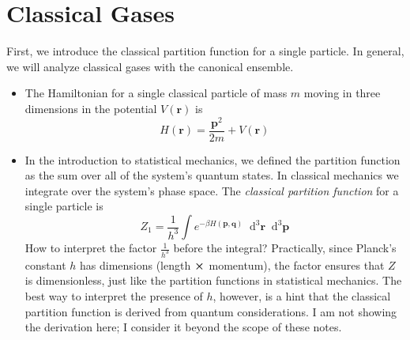 \documentclass[11pt, a4paper]{article}
\newcommand{\diff}{\mathop{}\!\mathrm{d}} %
\begin{document}
\section{Classical Gases}
First, we introduce the classical partition function for a single particle. In general, we will analyze classical gases with the canonical ensemble. 
\begin{itemize}
	\item The Hamiltonian for a single classical particle of mass $ m $ moving in three dimensions in the potential $ V(\bm{r}) $ is
	\begin{equation*}
		H(\bm{r}) = \frac{\bm{p}^{2}}{2m} + V(\bm{r})
	\end{equation*}
	
	\item In the introduction to statistical mechanics, we defined the partition function as the sum over all of the system's quantum states. In classical mechanics we integrate over the system's phase space. The \textit{classical partition function} for a single particle is
	\begin{equation*}
		Z_{1} = \frac{1}{h^{3}}\int e^{-\beta H(\bm{p}, \bm{q})} \diff^{3}\bm{r}\diff^{3}\bm{p}
	\end{equation*}
	How to interpret the factor $ \frac{1}{h^{3}} $ before the integral? Practically, since Planck's constant $ h $ has dimensions (length $ \cross $ momentum), the factor ensures that $ Z $ is dimensionless, just like the partition functions in statistical mechanics. The best way to interpret the presence of $ h $, however, is a hint that the classical partition function is derived from quantum considerations. I am not showing the derivation here; I consider it beyond the scope of these notes. 
	
\end{itemize}
\end{document}
